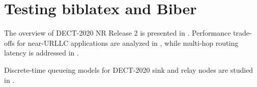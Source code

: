 \documentclass{article}
\begin{document}
\section{Testing biblatex and Biber}

The overview of DECT-2020 NR Release 2 is presented in \textcite{ETSI103636-1}. 
Performance trade-offs for near-URLLC applications are analyzed in \parencite{Samuylov2024}, while multi-hop routing latency is addressed in \autocite[1]{Asif2025}.

Discrete-time queueing models for DECT-2020 sink and relay nodes are studied in \autocite{Morozova2025Comparison,Morozova2025AoI}.

\printbibliography
\end{document}
